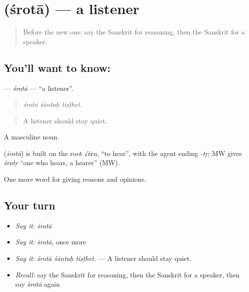 \section[\texorpdfstring{\sk{श्रोता} (śrotā)}{श्रोता (śrotā)}]{ (śrotā) — a listener}

\label{lesson:SA-C343-srota}



\begin{quote}
Before the new one: say the Sanskrit for reasoning, then the Sanskrit for a speaker.
\end{quote}

\subsection*{You'll want to know: }
\textbf{} — \emph{śrotā} — \textquotedblleft{}a listener\textquotedblright{}.

\begin{quote}
  
\end{quote}

\begin{quote}
\emph{śrotā śāntaḥ tiṣṭhet.}
\end{quote}

\begin{quote}
A listener should stay quiet.
\end{quote}

A masculine noun.

\begin{cousinweb}
\textbf{} (\emph{śrotā}) is built on the root √śru, \textquotedblleft{}to hear\textquotedblright{}, with the agent ending \emph{-tṛ}; MW gives \emph{śrotṛ} \textquotedblleft{}one who hears, a hearer\textquotedblright{} (MW).
\end{cousinweb}

\begin{grammarlens}[title={What you've built}]
One more word for giving reasons and opinions.
\end{grammarlens}

\subsection*{Your turn}
\begin{itemize}
\raggedright
  \item \emph{Say it:} \emph{śrotā}
  \item \emph{Say it:} \emph{śrotā}, once more
  \item \emph{Say it:} \emph{śrotā śāntaḥ tiṣṭhet.} — A listener should stay quiet.
  \item \emph{Recall:} say the Sanskrit for reasoning, then the Sanskrit for a speaker, then say \emph{śrotā} again
\end{itemize}


